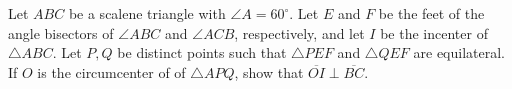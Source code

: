 Let $ABC$ be a scalene triangle with $\angle A = 60^{\circ}$. Let $E$ and $F$ be the feet of the angle bisectors of $\angle ABC$ and $\angle ACB$, respectively, and let $I$ be the incenter of $\triangle ABC$. Let $P,Q$ be distinct points such that $\triangle PEF$ and $\triangle QEF$ are equilateral. If $O$ is the circumcenter of of $\triangle APQ$, show that $\overline{OI}\perp \overline{BC}$.

